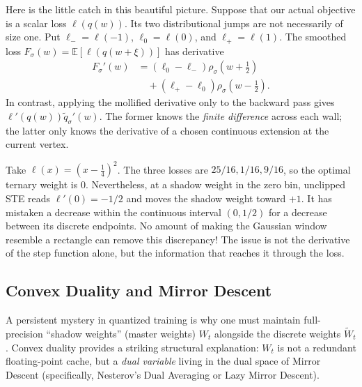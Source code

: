 Here is the little catch in this beautiful picture. Suppose that our actual objective is a scalar loss $\ell(q(w))$. Its two distributional jumps are not necessarily of size one. Put $\ell_-= \ell(-1)$, $\ell_0=\ell(0)$, and $\ell_+=\ell(1)$. The smoothed loss $F_\sigma(w)=\mathbb E[\ell(q(w+\xi))]$ has derivative
\begin{equation}
 \begin{aligned}
 F_\sigma'(w)
 &= (\ell_0-\ell_-)\rho_\sigma(w+\tfrac12)\\
 &\quad+(\ell_+-\ell_0)\rho_\sigma(w-\tfrac12).
 \end{aligned}
\end{equation}
In contrast, applying the mollified derivative only to the backward pass gives $\ell'(q(w))\widetilde q_\sigma'(w)$. The former knows the \emph{finite difference} across each wall; the latter only knows the derivative of a chosen continuous extension at the current vertex.

Take $\ell(x)=(x-\tfrac14)^2$. The three losses are $25/16,1/16,9/16$, so the optimal ternary weight is $0$. Nevertheless, at a shadow weight in the zero bin, unclipped STE reads $\ell'(0)=-1/2$ and moves the shadow weight toward $+1$. It has mistaken a decrease within the continuous interval $(0,1/2)$ for a decrease between its discrete endpoints. No amount of making the Gaussian window resemble a rectangle can remove this discrepancy! The issue is not the derivative of the step function alone, but the information that reaches it through the loss.

\subsection{Convex Duality and Mirror Descent}

A persistent mystery in quantized training is why one must maintain full-precision ``shadow weights'' (master weights) $W_t$ alongside the discrete weights $\widetilde{W}_t$. Convex duality provides a striking structural explanation: $W_t$ is not a redundant floating-point cache, but a \emph{dual variable} living in the dual space of Mirror Descent (specifically, Nesterov's Dual Averaging or Lazy Mirror Descent).

